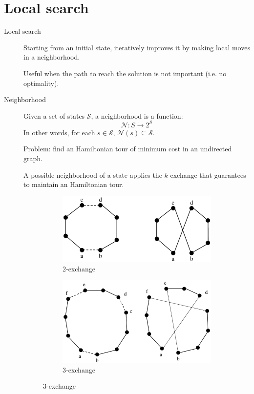 \chapter{Local search}

\begin{description}
    \item[Local search] 
        Starting from an initial state, iteratively improves it by making local moves in a neighborhood.

        Useful when the path to reach the solution is not important (i.e. no optimality).

    \item[Neighborhood] 
        Given a set of states $\mathcal{S}$, a neighborhood is a function:
        \[ \mathcal{N}: S \rightarrow 2^\mathcal{S} \]
        In other words, for each $s \in \mathcal{S}$, $\mathcal{N}(s) \subseteq \mathcal{S}$.

        \begin{example}
            Problem: find an Hamiltonian tour of minimum cost in an undirected graph.
            
            A possible neighborhood of a state applies the $k$-exchange that guarantees to maintain an Hamiltonian tour.
            \begin{figure}[ht]
                \begin{subfigure}{.5\textwidth}
                    \centering
                    \includegraphics[width=.70\linewidth]{img/tsp_2-exchange.png}
                    \caption{2-exchange}
                \end{subfigure}%
                \begin{subfigure}{.5\textwidth}
                    \centering
                    \includegraphics[width=.70\linewidth]{img/tsp_3-exchange.png}
                    \caption{3-exchange}
                \end{subfigure}
            \end{figure}
        \end{example}


\end{description}
